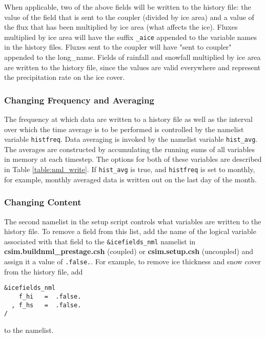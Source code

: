 When applicable, two of the above fields will be written to the
history file:  the value of the field that is sent to the coupler
(divided by ice area) and a value of the flux that has been multiplied by
ice area (what affects the ice). Fluxes multiplied by ice area will have
the suffix {\tt \_aice} appended to the variable names in the history files.
Fluxes sent to the coupler will have "sent to coupler" appended to the
long\_name.  Fields of rainfall and snowfall multiplied by ice area are
written to the history file, since the values are valid everywhere and
represent the precipitation rate on the ice cover.




\subsubsection{Changing Frequency and Averaging} 

The frequency at which data are written to a history file as well as the
interval over which the time average is to be performed is controlled
by the namelist variable {\tt histfreq}.  Data averaging is invoked
by the namelist variable {\tt hist\_avg}.  The averages are constructed
by accumulating the running sums of all variables in memory at each timestep.
The options for both of these variables are described in Table 
\ref{table:nml_write}.  If {\tt hist\_avg} is true, and {\tt histfreq}
is set to monthly, for example, monthly averaged data is written out on
the last day of the month.

\subsubsection{Changing Content} 
\label{change_content}

The second namelist in the setup script controls what variables are written
to the history file. To remove a field from this list, add the name of the
logical variable associated with that field to the {\tt \&icefields\_nml}
namelist in {\bf csim.buildnml\_prestage.csh} (coupled) or {\bf csim.setup.csh}
(uncoupled) and assign it a value of {\tt .false.}.  For example, to remove
ice thickness and snow cover from the history file, add

\begin{verbatim}
&icefields_nml
    f_hi   =  .false.
  , f_hs   =  .false.
/
\end{verbatim}
to the namelist.  

